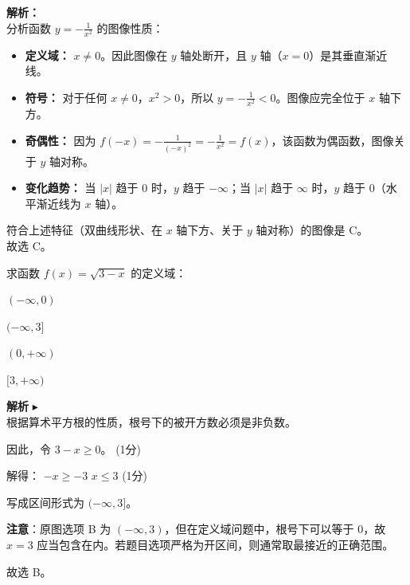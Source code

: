 \documentclass[12pt,a4paper]{exam-zh}
\begin{document}
\begin{solution}
    \textbf{解析：} \\
    分析函数 $\displaystyle y = -\frac{1}{x^2}$ 的图像性质：
    \begin{itemize}
        \item \textbf{定义域：} $x \neq 0$。因此图像在 $y$ 轴处断开，且 $y$ 轴（$x=0$）是其垂直渐近线。
        \item \textbf{符号：} 对于任何 $x \neq 0$，$x^2 > 0$，所以 $\displaystyle y = -\frac{1}{x^2} < 0$。图像应完全位于 $x$ 轴下方。
        \item \textbf{奇偶性：} 因为 $f(-x) = \displaystyle -\frac{1}{(-x)^2} = -\frac{1}{x^2} = f(x)$，该函数为偶函数，图像关于 $y$ 轴对称。
        \item \textbf{变化趋势：} 当 $|x|$ 趋于 $0$ 时，$y$ 趋于 $-\infty$；当 $|x|$ 趋于 $\infty$ 时，$y$ 趋于 $0$（水平渐近线为 $x$ 轴）。
    \end{itemize}
    符合上述特征（双曲线形状、在 $x$ 轴下方、关于 $y$ 轴对称）的图像是 C。 \\
    故选 C。
\end{solution}

\begin{question}
    求函数 $f(x) = \sqrt{3 - x}$ 的定义域： \paren[B]
    \begin{choices}
        \item $(-\infty, 0)$ \item $(-\infty, 3]$ \item $(0, +\infty)$ \item $[3, +\infty)$
    \end{choices}
\end{question}

\begin{solution}
    \textbf{解析} $\blacktriangleright$ \\
    根据算术平方根的性质，根号下的被开方数必须是非负数。
    
    因此，令 $3 - x \ge 0$。 \hfill (1分)
    
    解得：
    $-x \ge -3$
    $x \le 3$ \hfill (1分)
    
    写成区间形式为 $(-\infty, 3]$。
    
    \textbf{注意}：原图选项 B 为 $(-\infty, 3)$，但在定义域问题中，根号下可以等于 $0$，故 $x=3$ 应当包含在内。若题目选项严格为开区间，则通常取最接近的正确范围。
    
    故选 B。
\end{solution}
\end{document}
